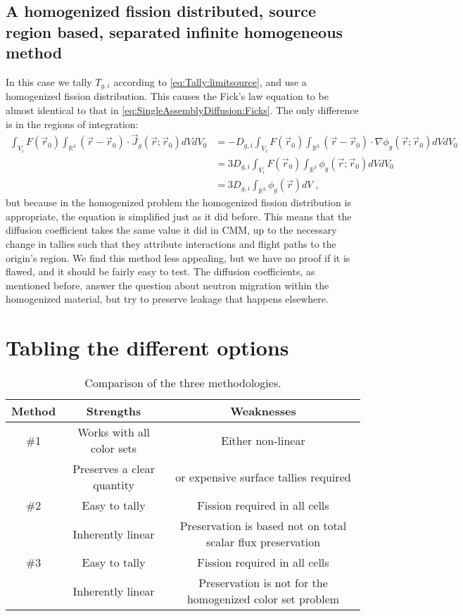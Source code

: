 \documentclass[a4paper,letterpaper,12pt,oneside,draft]{article}
\newcommand{\eec}{\;,}
\newcommand{\allspace}{\ensuremath{\mathbb{R}^3}}
\newcommand{\vr}{\ensuremath{\vec{r}}}
\newcommand{\dvr}{\left(\vr-\vr_0\right)}
\begin{document}
\subsection{A homogenized fission distributed, source region based, separated infinite homogeneous method}
In this case we tally $T_{g,i}$ according to \cref{eq:Tally:limitsource}, and use a homogenized fission distribution.
This causes the Fick's law equation to be almost identical to that in \cref{eq:SingleAssemblyDiffusion:Ficks}. 
The only difference is in the regions of integration:
\begin{align}
    \nonumber
    \int_{V_i} F(\vr_0)\int_{\allspace} \dvr\cdot\vec{J}_g(\vr;\vr_0) dVdV_0 &= -D_{g,i} \int_{V_i} F(\vr_0) \int_{\allspace} \dvr\cdot\nabla \phi_g(\vr;\vr_0)dVdV_0 \\\nonumber
    &= 3D_{g,i} \int_{V_i} F(\vr_0) \int_{\allspace}\phi_g(\vr;\vr_0)dVdV_0 \\
    \label{eq:HomFissSourceInf}
    &= 3D_{g,i} \int_{\allspace}\phi_g(\vr)dV\eec
\end{align}
but because in the homogenized problem the homogenized fission distribution is appropriate, the equation is simplified just as it did before.
This means that the diffusion coefficient takes the same value it did in CMM, up to the necessary change in tallies such that they attribute interactions and flight paths to the origin's region.
We find this method less appealing, but we have no proof if it is flawed, and it should be fairly easy to test.
The diffusion coefficients, as mentioned before, answer the question about neutron migration within the homogenized material, but try to preserve leakage that happens elsewhere.

\section{Tabling the different options}

\begin{table}[h!]
    \caption{Comparison of the three methodologies.}\label{tbl:options}
    \begin{tabular}{|c|c|c|}
        \hline
        Method & Strengths & Weaknesses \\
        \hline
        \#1 & Works with all color sets & Either non-linear \\
        & Preserves a clear quantity & or expensive surface tallies required \\
        \hline
        \#2 & Easy to tally & Fission required in all cells \\
        & Inherently linear & Preservation is based not on total scalar flux preservation \\
        \hline
        \#3 & Easy to tally & Fission required in all cells \\
        & Inherently linear & Preservation is not for the homogenized color set problem \\
        \hline
    \end{tabular}
\end{table}
\end{document}
